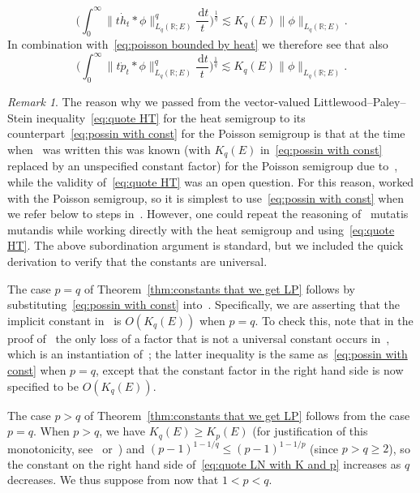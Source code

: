 \documentclass[11pt,reqno]{amsart}
\newcommand{\R}{\mathbb{R}}
\newcommand{\ud}[0]{\,\mathrm{d}}
\newcommand{\0}{\mathbf{0}}
\renewcommand{\1}{\mathbf 1}
\renewcommand{\ge}{\geqslant}
\renewcommand{\le}{\leqslant}
\theoremstyle{remark}
\newtheorem{remark}[thm]{Remark}
\begin{document}
\begin{equation}\label{eq:quote HT}
\bigg(\int_0^\infty \|t\dot{h}_t*\phi\|_{L_q(\R;E)}^q\frac{\ud t}{t}\bigg)^{\frac{1}{q}}\lesssim K_q(E) \|\phi\|_{L_q(\R;E)}.
\end{equation}
In combination with~\eqref{eq:poisson bounded by heat} we therefore see that also
\begin{equation}\label{eq:possin with const}
\bigg(\int_0^\infty \|t\dot{p}_t*\phi\|_{L_q(\R;E)}^q\frac{\ud t}{t}\bigg)^{\frac{1}{q}}\lesssim K_q(E)\|\phi\|_{L_q(\R;E)}.
\end{equation}

\begin{remark} The reason why we passed from the vector-valued Littlewood--Paley--Stein inequality~\eqref{eq:quote HT} for the heat semigroup to its counterpart~\eqref{eq:possin with const}  for the Poisson semigroup is that at the time when~\cite{LN14} was written this was known (with $K_q(E)$ in~\eqref{eq:possin with const} replaced by an unspecified constant factor) for the Poisson semigroup due to~\cite{MTX06}, while the validity of~\eqref{eq:quote HT} was an open question. For this reason, \cite{LN14} worked with the Poisson semigroup, so it is simplest to use~\eqref{eq:possin with const} when we refer below to steps in~\cite{LN14}. However, one could  repeat the reasoning of~\cite{LN14} mutatis mutandis while working directly with the heat semigroup and using~\eqref{eq:quote HT}. The above subordination argument is standard, but we included the quick derivation to verify that the constants are universal.
\end{remark}



The case $p=q$ of Theorem~\ref{thm:constants that we get LP} follows by substituting~\eqref{eq:possin with const} into~\cite{LafforgueNaor}. Specifically, we are asserting  that the implicit constant in~\cite[Theorem~2.1]{LafforgueNaor}  is $O(K_q(E))$ when $p=q$. To check this, note that in the proof of~\cite[Theorem~2.1]{LafforgueNaor} the only loss of a factor that is not a universal constant occurs in~\cite[equation~(18)]{LafforgueNaor}, which  is an instantiation of~\cite[inequality~(15)]{LafforgueNaor}; the latter inequality is the same as~\eqref{eq:possin with const} when $p=q$, except that the constant factor in the right hand side is now specified to be $O(K_q(E))$.

The case $p>q$ of Theorem~\ref{thm:constants that we get LP} follows from the case $p=q$.  When $p>q$, we have $K_{q}(E)\ge K_{p}(E)$ (for justification of this monotonicity, see~\cite{BCL94} or~\cite[Section~6.2]{MN14}) and $(p-1)^{1-1/q}\le (p-1)^{1-1/p}$ (since $p>q\ge 2$), so the constant on the right hand side of~\eqref{eq:quote LN with K and p} increases as $q$ decreases. We thus suppose from now that $1<p<q$.
\end{document}
